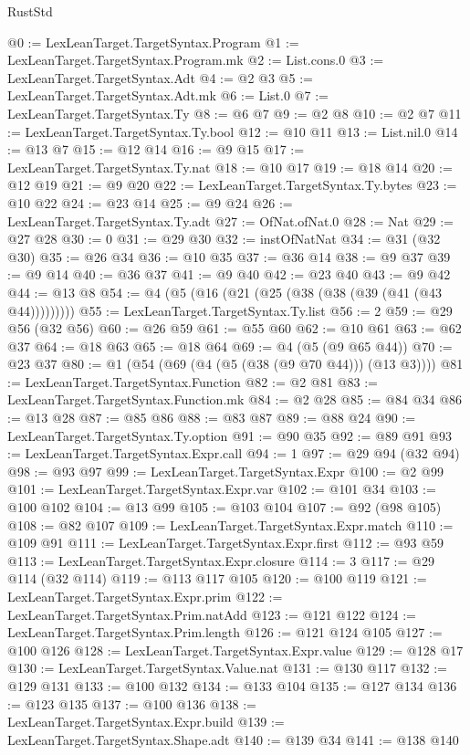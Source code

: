 \begin{lexlean}{RustStd}
\begin{coremodule}
{\begin{coremodule}
{{{{{{{{{{{{{{{{{{{{{{{{{{{{{{{{{{{{{{{{{{{{{{{{{{{{{{{@0 := LexLeanTarget.TargetSyntax.Program
@1 := LexLeanTarget.TargetSyntax.Program.mk
@2 := List.cons.{0}
@3 := LexLeanTarget.TargetSyntax.Adt
@4 := @2 @3
@5 := LexLeanTarget.TargetSyntax.Adt.mk
@6 := List.{0}
@7 := LexLeanTarget.TargetSyntax.Ty
@8 := @6 @7
@9 := @2 @8
@10 := @2 @7
@11 := LexLeanTarget.TargetSyntax.Ty.bool
@12 := @10 @11
@13 := List.nil.{0}
@14 := @13 @7
@15 := @12 @14
@16 := @9 @15
@17 := LexLeanTarget.TargetSyntax.Ty.nat
@18 := @10 @17
@19 := @18 @14
@20 := @12 @19
@21 := @9 @20
@22 := LexLeanTarget.TargetSyntax.Ty.bytes
@23 := @10 @22
@24 := @23 @14
@25 := @9 @24
@26 := LexLeanTarget.TargetSyntax.Ty.adt
@27 := OfNat.ofNat.{0}
@28 := Nat
@29 := @27 @28
@30 := 0
@31 := @29 @30
@32 := instOfNatNat
@34 := @31 (@32 @30)
@35 := @26 @34
@36 := @10 @35
@37 := @36 @14
@38 := @9 @37
@39 := @9 @14
@40 := @36 @37
@41 := @9 @40
@42 := @23 @40
@43 := @9 @42
@44 := @13 @8
@54 := @4 (@5 (@16 (@21 (@25 (@38 (@38 (@39 (@41 (@43 @44)))))))))
@55 := LexLeanTarget.TargetSyntax.Ty.list
@56 := 2
@59 := @29 @56 (@32 @56)
@60 := @26 @59
@61 := @55 @60
@62 := @10 @61
@63 := @62 @37
@64 := @18 @63
@65 := @18 @64
@69 := @4 (@5 (@9 @65 @44))
@70 := @23 @37
@80 := @1 (@54 (@69 (@4 (@5 (@38 (@9 @70 @44))) (@13 @3))))
@81 := LexLeanTarget.TargetSyntax.Function
@82 := @2 @81
@83 := LexLeanTarget.TargetSyntax.Function.mk
@84 := @2 @28
@85 := @84 @34
@86 := @13 @28
@87 := @85 @86
@88 := @83 @87
@89 := @88 @24
@90 := LexLeanTarget.TargetSyntax.Ty.option
@91 := @90 @35
@92 := @89 @91
@93 := LexLeanTarget.TargetSyntax.Expr.call
@94 := 1
@97 := @29 @94 (@32 @94)
@98 := @93 @97
@99 := LexLeanTarget.TargetSyntax.Expr
@100 := @2 @99
@101 := LexLeanTarget.TargetSyntax.Expr.var
@102 := @101 @34
@103 := @100 @102
@104 := @13 @99
@105 := @103 @104
@107 := @92 (@98 @105)
@108 := @82 @107
@109 := LexLeanTarget.TargetSyntax.Expr.match
@110 := @109 @91
@111 := LexLeanTarget.TargetSyntax.Expr.first
@112 := @93 @59
@113 := LexLeanTarget.TargetSyntax.Expr.closure
@114 := 3
@117 := @29 @114 (@32 @114)
@119 := @113 @117 @105
@120 := @100 @119
@121 := LexLeanTarget.TargetSyntax.Expr.prim
@122 := LexLeanTarget.TargetSyntax.Prim.natAdd
@123 := @121 @122
@124 := LexLeanTarget.TargetSyntax.Prim.length
@126 := @121 @124 @105
@127 := @100 @126
@128 := LexLeanTarget.TargetSyntax.Expr.value
@129 := @128 @17
@130 := LexLeanTarget.TargetSyntax.Value.nat
@131 := @130 @117
@132 := @129 @131
@133 := @100 @132
@134 := @133 @104
@135 := @127 @134
@136 := @123 @135
@137 := @100 @136
@138 := LexLeanTarget.TargetSyntax.Expr.build
@139 := LexLeanTarget.TargetSyntax.Shape.adt
@140 := @139 @34
@141 := @138 @140
}}}}}}}}}}}}}}}}}}}}}}}}}}}}}}}}}}}}}}}}}}}}}}}}}}}}}}}
\end{coremodule}}
\end{coremodule}
\end{lexlean}
